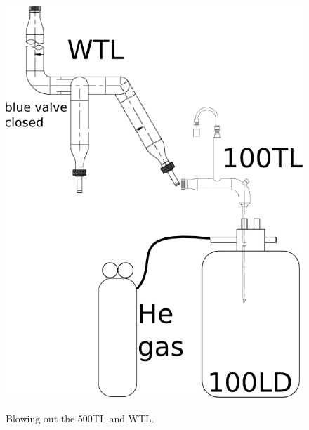 \begin{figure}[htbp!]
\begin{minipage}{.48\textwidth}
 \includegraphics[width=\textwidth]{./img/100LDfill-02-blow-out-WTL.png}
 \label{fig:100LDfill-02-blow-out-WTL}
 \end{minipage}
 \caption{Blowing out the 500TL and WTL.}
\end{figure}


